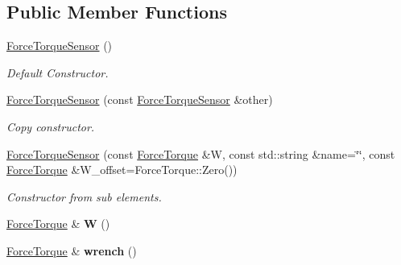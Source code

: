 \subsection*{Public Member Functions}
\begin{DoxyCompactItemize}
\item 
\hyperlink{classow__core_1_1ForceTorqueSensor_a3d56c844258af22e89880f0c4617d3a6}{Force\+Torque\+Sensor} ()\hypertarget{classow__core_1_1ForceTorqueSensor_a3d56c844258af22e89880f0c4617d3a6}{}\label{classow__core_1_1ForceTorqueSensor_a3d56c844258af22e89880f0c4617d3a6}

\begin{DoxyCompactList}\small\item\em Default Constructor. \end{DoxyCompactList}\item 
\hyperlink{classow__core_1_1ForceTorqueSensor_afb38ce6ce7ee5d6d9ac53daa51d22f0b}{Force\+Torque\+Sensor} (const \hyperlink{classow__core_1_1ForceTorqueSensor}{Force\+Torque\+Sensor} \&other)\hypertarget{classow__core_1_1ForceTorqueSensor_afb38ce6ce7ee5d6d9ac53daa51d22f0b}{}\label{classow__core_1_1ForceTorqueSensor_afb38ce6ce7ee5d6d9ac53daa51d22f0b}

\begin{DoxyCompactList}\small\item\em Copy constructor. \end{DoxyCompactList}\item 
\hyperlink{classow__core_1_1ForceTorqueSensor_ad249792b0cae29c837b751bfa6cbecb7}{Force\+Torque\+Sensor} (const \hyperlink{classow__core_1_1Wrench}{Force\+Torque} \&W, const std\+::string \&name=\char`\"{}\char`\"{}, const \hyperlink{classow__core_1_1Wrench}{Force\+Torque} \&W\+\_\+offset=Force\+Torque\+::\+Zero())\hypertarget{classow__core_1_1ForceTorqueSensor_ad249792b0cae29c837b751bfa6cbecb7}{}\label{classow__core_1_1ForceTorqueSensor_ad249792b0cae29c837b751bfa6cbecb7}

\begin{DoxyCompactList}\small\item\em Constructor from sub elements. \end{DoxyCompactList}\item 
\hyperlink{classow__core_1_1Wrench}{Force\+Torque} \& {\bfseries W} ()\hypertarget{classow__core_1_1ForceTorqueSensor_a71c9a01ba88d9a2e82a6c634990e9383}{}\label{classow__core_1_1ForceTorqueSensor_a71c9a01ba88d9a2e82a6c634990e9383}

\item 
\hyperlink{classow__core_1_1Wrench}{Force\+Torque} \& {\bfseries wrench} ()\hypertarget{classow__core_1_1ForceTorqueSensor_a98f0b62826034381286e08a27003fe4e}{}\label{classow__core_1_1ForceTorqueSensor_a98f0b62826034381286e08a27003fe4e}


\end{DoxyCompactItemize}
